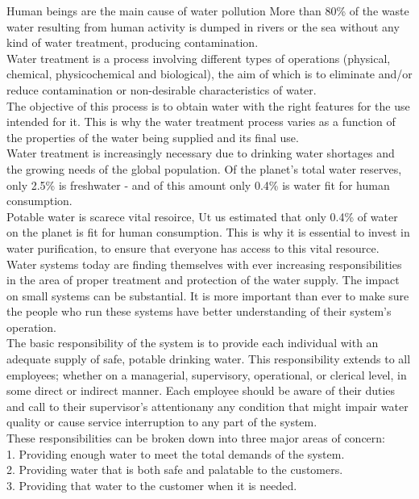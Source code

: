 \documentclass{article}
\begin{document}
Human beings are the main cause of water pollution More than 80\% of the waste water resulting from human activity is dumped in rivers or the sea without any kind of water treatment, producing contamination.\\

Water treatment is a process involving different types of operations (physical, chemical, physicochemical and biological), the aim of which is to eliminate and/or reduce contamination or non-desirable characteristics of water.\\

The objective of this process is to obtain water with the right features for the use intended for it. This is why the water treatment process varies as a function of the properties of the water being supplied and its final use.\\

Water treatment is increasingly necessary due to drinking water shortages and the growing needs of the global population. Of the planet’s total water reserves, only 2.5\% is freshwater - and of this amount only 0.4\% is water fit for human consumption.\\


Potable water is scarece vital resoirce,  Ut us estimated that only 0.4\% of water on the planet is fit for human consumption.  This is why it is essential to invest in water purification, to ensure that everyone has access to this vital resource. \\

Water systems today are finding themselves with ever increasing responsibilities in the area of proper treatment and protection of the water supply. The impact on small systems can be substantial. It is more important than ever to make sure the people who run these systems have better
understanding of their system’s operation.\\

The basic responsibility of the system is to provide each individual with an adequate supply of safe, potable drinking water. This responsibility extends to all employees; whether on a managerial, supervisory, operational, or clerical level, in some direct or indirect manner. Each employee should be aware of their duties and call to their supervisor’s attentionany any condition that might impair water quality or cause service interruption to any part of the system.\\
These responsibilities can be broken down into three major areas of concern:\\
1. Providing enough water to meet the total demands of the system.\\
2. Providing water that is both safe and palatable to the customers.\\
3. Providing that water to the customer when it is needed.\\
\end{document}
